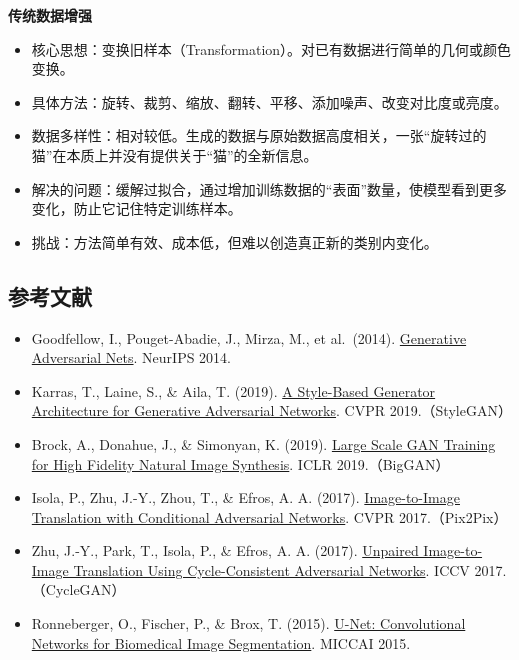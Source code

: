 \textbf{传统数据增强}

\begin{itemize}
\tightlist
\item
  核心思想：变换旧样本（Transformation）。对已有数据进行简单的几何或颜色变换。
\item
  具体方法：旋转、裁剪、缩放、翻转、平移、添加噪声、改变对比度或亮度。
\item
  数据多样性：相对较低。生成的数据与原始数据高度相关，一张``旋转过的猫''在本质上并没有提供关于``猫''的全新信息。
\item
  解决的问题：缓解过拟合，通过增加训练数据的``表面''数量，使模型看到更多变化，防止它记住特定训练样本。
\item
  挑战：方法简单有效、成本低，但难以创造真正新的类别内变化。
\end{itemize}

\FloatBarrier
{}
\hypertarget{ux53c2ux8003ux6587ux732e-38}{%
\subsection{参考文献}\label{ux53c2ux8003ux6587ux732e-38}}

\vspace{0.25em}
\begin{itemize}
\tightlist
\item
  Goodfellow, I., Pouget-Abadie, J., Mirza, M., et al.~(2014). \href{https://papers.nips.cc/paper/5423-generative-adversarial-nets}{Generative Adversarial Nets}. NeurIPS 2014.
\item
  Karras, T., Laine, S., \& Aila, T. (2019). \href{https://openaccess.thecvf.com/content_CVPR_2019/html/Karras_A_Style-Based_Generator_Architecture_for_Generative_Adversarial_Networks_CVPR_2019_paper.html}{A Style-Based Generator Architecture for Generative Adversarial Networks}. CVPR 2019.（StyleGAN）
\item
  Brock, A., Donahue, J., \& Simonyan, K. (2019). \href{https://arxiv.org/abs/1809.11096}{Large Scale GAN Training for High Fidelity Natural Image Synthesis}. ICLR 2019.（BigGAN）
\item
  Isola, P., Zhu, J.-Y., Zhou, T., \& Efros, A. A. (2017). \href{https://openaccess.thecvf.com/content_cvpr_2017/html/Isola_Image-To-Image_Translation_With_CVPR_2017_paper.html}{Image-to-Image Translation with Conditional Adversarial Networks}. CVPR 2017.（Pix2Pix）
\item
  Zhu, J.-Y., Park, T., Isola, P., \& Efros, A. A. (2017). \href{https://openaccess.thecvf.com/content_iccv_2017/html/Zhu_Unpaired_Image-To-Image_Translation_ICCV_2017_paper.html}{Unpaired Image-to-Image Translation Using Cycle-Consistent Adversarial Networks}. ICCV 2017.（CycleGAN）
\item
  Ronneberger, O., Fischer, P., \& Brox, T. (2015). \href{https://arxiv.org/abs/1505.04597}{U-Net: Convolutional Networks for Biomedical Image Segmentation}. MICCAI 2015.
\end{itemize}

\clearpage
